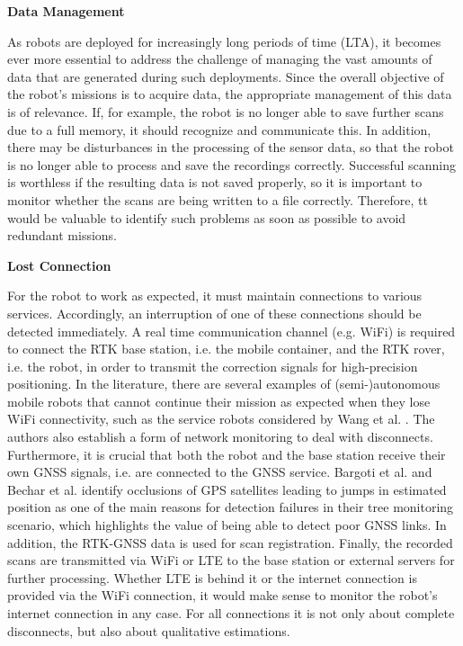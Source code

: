 \documentclass[english, master, utf8]{base/thesis_KBS}
\begin{document}
\noindent
\textbf{Data Management}\newline

\noindent
As robots are deployed for increasingly long periods of time (LTA), it becomes ever more essential to address the challenge of managing the vast amounts of data that are generated
during such deployments. \cite{Ambrus:2014} Since the overall objective of the robot's missions is to acquire data, the appropriate management of this data is of relevance.
If, for example, the robot is no longer able to save further scans due to a full memory, it should recognize and communicate this.
In addition, there may be disturbances in the processing of the sensor data, so that the robot is no longer able to process and save the recordings correctly.
Successful scanning is worthless if the resulting data is not saved properly, so it is important to monitor whether the scans are being written to a file correctly.
Therefore, tt would be valuable to identify such problems as soon as possible to avoid redundant missions.\newline

\noindent
\textbf{Lost Connection}\newline

\noindent
For the robot to work as expected, it must maintain connections to various services. Accordingly, an interruption of one of these connections should be detected immediately.
A real time communication channel (e.g. WiFi) is required to connect the RTK base station, i.e. the mobile container, and the RTK rover, i.e. the robot, in order to
transmit the correction signals for high-precision positioning. In the literature, there are several examples of (semi-)autonomous mobile robots that cannot continue their
mission as expected when they lose WiFi connectivity, such as the service robots considered by Wang et al. \cite{Wang:2018}. The authors also establish a form of network monitoring
to deal with disconnects.
Furthermore, it is crucial that both the robot and the base station receive their own GNSS signals,
i.e. are connected to the GNSS service. Bargoti et al. \cite{Bargoti:2015} and Bechar et al. \cite{Bechar:2016} identify occlusions of GPS satellites leading to jumps in estimated position as one of the main reasons
for detection failures in their tree monitoring scenario, which highlights the value of being able to detect poor GNSS links.
In addition, the RTK-GNSS data is used for scan registration. Finally, the recorded scans are transmitted via WiFi or LTE 
to the base station or external servers for further processing. Whether LTE is behind it or the internet connection is provided via the WiFi connection, it would make sense
to monitor the robot's internet connection in any case. For all connections it is not only about complete disconnects, but also about qualitative estimations.\newline
\end{document}
